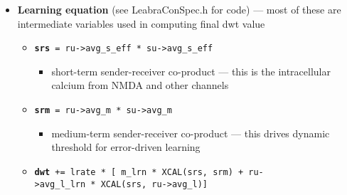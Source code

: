 \begin{itemize}
\tightlist
\item
  \textbf{Learning equation} (see LeabraConSpec.h for code) --- most of
  these are intermediate variables used in computing final dwt value

  \begin{itemize}
  \tightlist
  \item
    \textbf{\texttt{srs}}\texttt{\ =\ ru-\textgreater{}avg\_s\_eff\ *\ su-\textgreater{}avg\_s\_eff}

    \begin{itemize}
    \tightlist
    \item
      short-term sender-receiver co-product --- this is the
      intracellular calcium from NMDA and other channels
    \end{itemize}
  \item
    \textbf{\texttt{srm}}\texttt{\ =\ ru-\textgreater{}avg\_m\ *\ su-\textgreater{}avg\_m}

    \begin{itemize}
    \tightlist
    \item
      medium-term sender-receiver co-product --- this drives dynamic
      threshold for error-driven learning
    \end{itemize}
  \item
    \textbf{\texttt{dwt}}\texttt{\ +=\ lrate\ *\ {[}\ m\_lrn\ *\ XCAL(srs,\ srm)\ +\ ru-\textgreater{}avg\_l\_lrn\ *\ XCAL(srs,\ ru-\textgreater{}avg\_l){]}}


\end{itemize}
\end{itemize}
